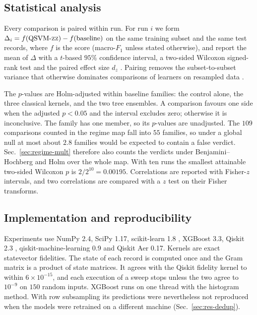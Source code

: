 \subsection{Statistical analysis}\label{sec:stats}

Every comparison is paired within run. For run $i$ we form
$\Delta_i = f(\text{QSVM-\textsc{zz}{}}) - f(\text{baseline})$ on the same training subset and the same
test records, where $f$ is the score (macro-$F_1$ unless stated otherwise), and report the mean of $\Delta$ with a $t$-based $95\%$ confidence interval, a
two-sided Wilcoxon signed-rank test \cite{wilcoxon1945} and the paired effect size $d_z$ \cite{ref32}. Pairing
removes the subset-to-subset variance that otherwise dominates comparisons of learners on
resampled data \cite{ref31}.

The $p$-values are Holm-adjusted \cite{holm1979} within baseline families: the \Zmap{} control alone, the three
classical kernels, and the two tree ensembles. A comparison favours one side when the adjusted
$p<0.05$ and the interval excludes zero; otherwise it is inconclusive. The \Zmap{} family has one
member, so its $p$-values are unadjusted. The $109$ comparisons counted in the regime map fall into $55$
families, so under a global null at most about $2.8$ families would be expected to contain a
false verdict.
Sec.~\ref{sec:regime-mult} therefore also counts the verdicts under Benjamini--Hochberg
\cite{benjamini1995} and Holm over the whole map. With ten runs the smallest attainable two-sided Wilcoxon $p$ is
$2/2^{10}=0.00195$. Correlations are reported with Fisher-$z$ intervals, and two correlations
are compared with a $z$ test on their Fisher transforms.

\subsection{Implementation and reproducibility}\label{sec:repro}

Experiments use NumPy 2.4, SciPy 1.17, scikit-learn 1.8 \cite{ref30}, XGBoost 3.3, Qiskit 2.3
\cite{ref29}, qiskit-machine-learning 0.9 and Qiskit Aer 0.17. Kernels are exact statevector
fidelities. The state of each record is computed once and the Gram matrix is a product of
state matrices. It agrees with the Qiskit fidelity kernel to within $6\times10^{-15}$, and each
execution of a sweep stops unless the two agree to $10^{-9}$ on $150$ random inputs. XGBoost runs on one
thread with the histogram method. With row subsampling its predictions were nevertheless not
reproduced when the models were retrained on a different machine (Sec.~\ref{sec:res-dedup}).


